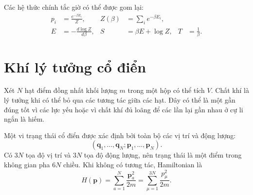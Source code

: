 \begin{classroomqa}
\end{classroomqa}

Các hệ thức chính tắc giờ có thể được gom lại:
\begin{align}
 p_i&=\frac{e^{-\beta E_i}}{Z},&
 Z(\beta)&=\sum_i e^{-\beta E_i},\label{eq:sm4-canonical-pair}\\
 E&=-\frac{d\log Z}{d\beta},&
 S&=\beta E+\log Z,&
 T&=\frac{1}{\beta}.
 \label{eq:sm4-canonical-identities}
\end{align}

\section{Khí lý tưởng cổ điển}

Xét \(N\) hạt điểm đồng nhất khối lượng \(m\) trong một hộp có thể tích
\(V\). Chất khí là lý tưởng khi có thể bỏ qua các tương tác giữa các hạt. Đây có thể là một gần đúng tốt vì các lực yếu hoặc vì chất khí đủ loãng để các lần lại gần nhau ở cự li ngắn là hiếm.

Một vi trạng thái cổ điển được xác định bởi toàn bộ các vị trí và động lượng:
\begin{equation}
 (\bm q_1,\ldots,\bm q_N;\bm p_1,\ldots,\bm p_N).
\end{equation}
Có \(3N\) tọa độ vị trí và \(3N\) tọa độ động lượng, nên trạng thái là một điểm trong không gian pha \(6N\) chiều. Khi không có tương tác, Hamiltonian là
\begin{equation}
 H(\bm p)=\sum_{a=1}^{N}\frac{\bm p_a^2}{2m}
 =\sum_{\mu=1}^{3N}\frac{p_\mu^2}{2m}.
 \label{eq:sm4-ideal-hamiltonian}
\end{equation}

\begin{classroomqa}
\end{classroomqa}

